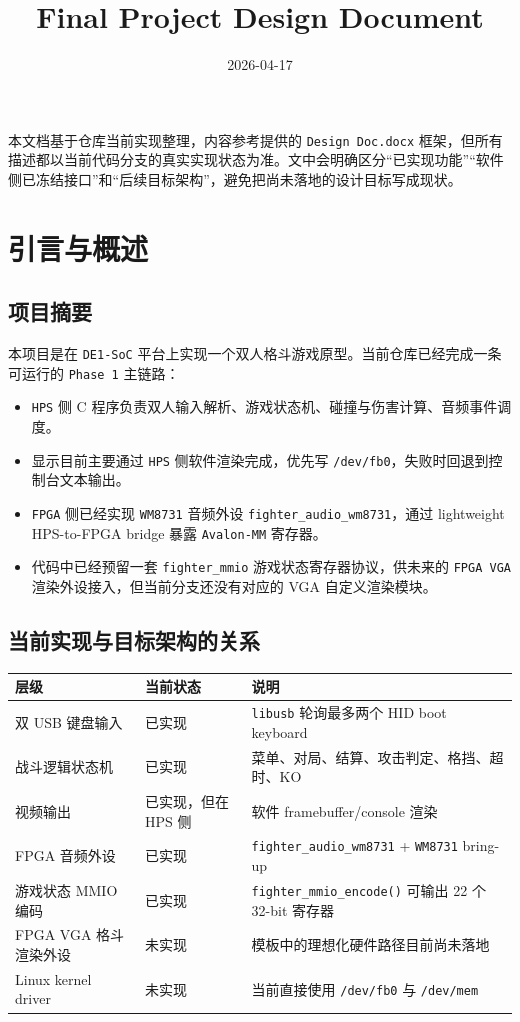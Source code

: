 \documentclass[12pt,a4paper]{ctexart}
\title{Final Project Design Document}
\author{}
\date{2026-04-17}
\begin{document}
\maketitle

本文档基于仓库当前实现整理，内容参考提供的 \texttt{Design Doc.docx} 框架，但所有描述都以当前代码分支的真实实现状态为准。文中会明确区分“已实现功能”“软件侧已冻结接口”和“后续目标架构”，避免把尚未落地的设计目标写成现状。

\section{引言与概述}

\subsection{项目摘要}

本项目是在 \texttt{DE1-SoC} 平台上实现一个双人格斗游戏原型。当前仓库已经完成一条可运行的 \texttt{Phase 1} 主链路：

\begin{itemize}
  \item \texttt{HPS} 侧 C 程序负责双人输入解析、游戏状态机、碰撞与伤害计算、音频事件调度。
  \item 显示目前主要通过 \texttt{HPS} 侧软件渲染完成，优先写 \texttt{/dev/fb0}，失败时回退到控制台文本输出。
  \item \texttt{FPGA} 侧已经实现 \texttt{WM8731} 音频外设 \texttt{fighter\_audio\_wm8731}，通过 lightweight HPS-to-FPGA bridge 暴露 \texttt{Avalon-MM} 寄存器。
  \item 代码中已经预留一套 \texttt{fighter\_mmio} 游戏状态寄存器协议，供未来的 \texttt{FPGA VGA} 渲染外设接入，但当前分支还没有对应的 VGA 自定义渲染模块。
\end{itemize}

\subsection{当前实现与目标架构的关系}

\begin{longtable}{>{\raggedright\arraybackslash}p{} >{\raggedright\arraybackslash}p{} >{\raggedright\arraybackslash}p{}}
\toprule
层级 & 当前状态 & 说明 \\
\midrule
\endhead
双 USB 键盘输入 & 已实现 & \texttt{libusb} 轮询最多两个 HID boot keyboard \\
战斗逻辑状态机 & 已实现 & 菜单、对局、结算、攻击判定、格挡、超时、KO \\
视频输出 & 已实现，但在 HPS 侧 & 软件 framebuffer/console 渲染 \\
FPGA 音频外设 & 已实现 & \texttt{fighter\_audio\_wm8731} + \texttt{WM8731} bring-up \\
游戏状态 MMIO 编码 & 已实现 & \texttt{fighter\_mmio\_encode()} 可输出 22 个 32-bit 寄存器 \\
FPGA VGA 格斗渲染外设 & 未实现 & 模板中的理想化硬件路径目前尚未落地 \\
Linux kernel driver & 未实现 & 当前直接使用 \texttt{/dev/fb0} 与 \texttt{/dev/mem} \\
\bottomrule
\end{longtable}
\end{document}
